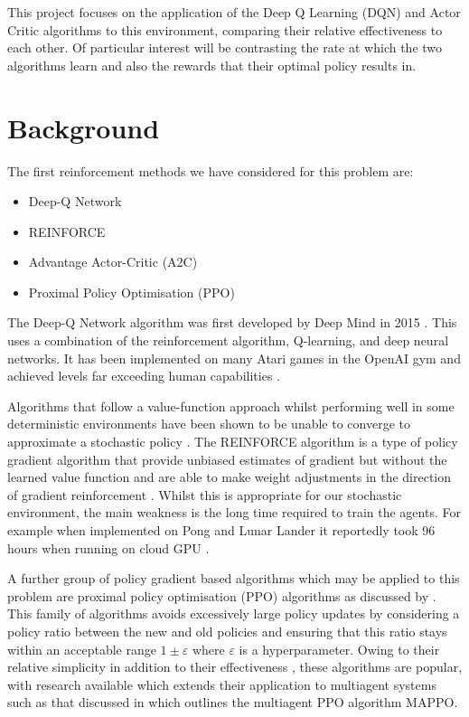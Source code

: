 \documentclass{article}
\begin{document}
This project focuses on the application of the Deep Q Learning (DQN) and Actor Critic algorithms to this environment, comparing their relative effectiveness to each other.
Of particular interest will be contrasting the rate at which the two algorithms learn and also the rewards that their optimal policy results in.

\section{Background} \label{Background}

The first reinforcement methods we have considered for this problem are:

\begin{itemize}
    \item Deep-Q Network
    \item REINFORCE
    \item Advantage Actor-Critic (A2C)
    \item Proximal Policy Optimisation (PPO)
\end{itemize}

The Deep-Q Network algorithm was first developed by Deep Mind in 2015 \citet{Mnih2015}.
This uses a combination of the reinforcement algorithm, Q-learning, and deep neural networks.
It has been implemented on many Atari games in the OpenAI gym and achieved levels far exceeding human capabilities \citet{Mnih2015}.

Algorithms that follow a value-function approach whilst performing well in some deterministic environments have been shown to be unable to converge to approximate a stochastic policy \citet{AdvanacesinNIPS}.
The REINFORCE algorithm is a type of policy gradient algorithm that provide unbiased estimates of gradient but without the learned value function and are able to make weight adjustments in the direction of gradient reinforcement \citet{Williams1992}.
Whilst this is appropriate for our stochastic environment, the main weakness is the long time required to train the agents. For example when implemented on Pong and Lunar Lander it reportedly took 96 hours when running on cloud GPU \citet{REINFORCE}.

A further group of policy gradient based algorithms which may be applied to this problem are proximal policy optimisation (PPO) algorithms as discussed by \citet{PPOAlgo}.
This family of algorithms avoids excessively large policy updates by considering a policy ratio between the new and old policies and ensuring that this ratio stays within an acceptable range $1\pm\varepsilon$ where $\varepsilon$ is a hyperparameter.
Owing to their relative simplicity in addition to their effectiveness \citet{PPOmultiagentgames}, these algorithms are popular, with research available which extends their application to multiagent systems such as that discussed in \citet{PPOAlgo} which outlines the multiagent PPO algorithm MAPPO.
\end{document}
